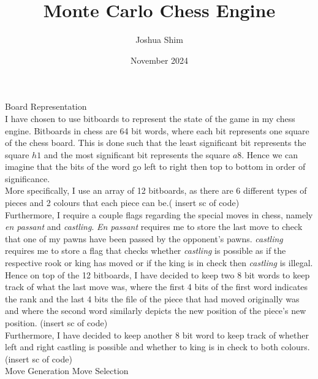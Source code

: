 \documentclass[12pt, letterpaper]{article}
\title{Monte Carlo Chess Engine}
\author{Joshua Shim}
\date{November 2024}
\begin{document}
\maketitle
\newpage
\LARGE{Board Representation}\\ \small
I have chosen to use bitboards to represent the state of the game in my chess engine. Bitboards in chess are 64 bit words, where each bit represents one square of the chess board. This is done such that the least significant bit represents the square $h1$ and the most significant bit represents the square $a8$. Hence we can imagine that the bits of the word go left to right then top to bottom in order of significance.\\
More specifically, I use an array of 12 bitboards, as there are 6 different types of pieces and 2 colours that each piece can be.( insert sc of code)\\ Furthermore, I require a couple flags regarding the special moves in chess, namely \textit{en passant} and \textit{castling}. \textit{En passant} requires me to store the last move to check that one of my pawns have been passed by the opponent's pawns. \textit{castling} requires me to store a flag that checks whether \textit{castling} is possible as if the respective rook or king has moved or if the king is in check then \textit{castling} is illegal.\\
Hence on top of the 12 bitboards, I have decided to keep two 8 bit words to keep track of what the last move was, where the first 4 bits of the first word indicates the rank and the last 4 bits the file of the piece that had moved originally was and where the second word similarly depicts the new position of the piece's new position. (insert sc of code)\\ Furthermore, I have decided to keep another 8 bit word to keep track of whether left and right castling is possible and whether to king is in check to both colours. (insert sc of code)\\
\newpage
\LARGE{Move Generation}
\newpage
\LARGE{Move Selection}
\end{document}
